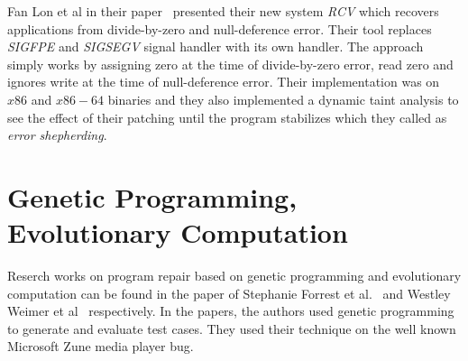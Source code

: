 Fan Lon et al in their paper~\cite{DBLP:conf/pldi/LongSR14} presented their new
system \emph{RCV} which recovers applications from divide-by-zero and
null-deference error. Their tool replaces \emph{SIGFPE} and \emph{SIGSEGV}
signal handler with its own handler. The approach simply works by assigning
zero at the time of divide-by-zero error, read zero and ignores write at the time
of null-deference error. Their implementation was on $x86$ and $x86-64$
binaries and they also implemented a dynamic taint analysis to see the effect of their
patching until the program stabilizes which they called as \emph{error
shepherding}.

\section{Genetic Programming, Evolutionary Computation}
\label{sec:RecWorksGeneric}

Reserch works on program repair based on genetic programming and evolutionary
computation can be found in the paper of Stephanie Forrest et
al.~\cite{DBLP:conf/gecco/2009g} and Westley Weimer et
al~\cite{DBLP:journals/cacm/WeimerFGN10} respectively. In the papers, the
authors used genetic programming to generate and evaluate test cases. They used
their technique on the well known Microsoft Zune media player bug.


